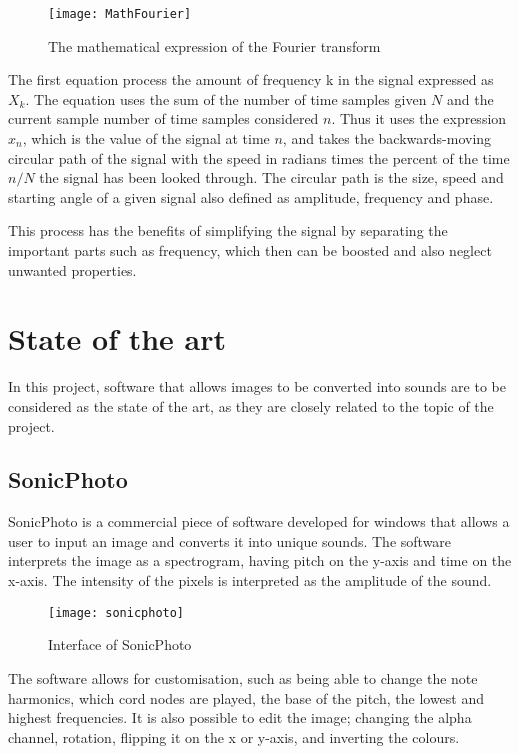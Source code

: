 \begin{figure}
\caption{The mathematical expression of the Fourier transform}
\centering
\texttt{[image: MathFourier]}
\end{figure}

The first equation process the amount of frequency k in the signal expressed as \(X_k\). The equation uses the sum of the number of time samples given \(N\) and the current sample number of time samples considered \(n\). Thus it uses the expression \(x_n\), which is the value of the signal at time \(n\), and takes  the backwards-moving circular path of the signal with the speed in radians times the percent of the time \(n/N\) the signal has been looked through. The circular path is the size, speed and starting angle of a given signal also defined as amplitude, frequency and phase.      

This process has the benefits of simplifying the signal by separating the important parts such as frequency, which then can be boosted and also neglect unwanted properties.       

\section{State of the art}\label{sec:stateart}
In this project, software that allows images to be converted into sounds are to be considered as the state of the art, as they are closely related to the topic of the project.

\subsection{SonicPhoto}\label{sub:sonic}
SonicPhoto \cite{White2013} is a commercial piece of software developed for windows that allows a user to input an image and converts it into unique sounds. The software interprets the image as a spectrogram, having pitch on the y-axis and time on the x-axis. The intensity of the pixels is interpreted as the amplitude of the sound. 

\begin{figure}[!h] 
\centering
\texttt{[image: sonicphoto]}
\caption{\label{fig:sonicphoto} Interface of SonicPhoto \cite{White2013}}
\end{figure}

The software allows for customisation, such as being able to change the note harmonics, which cord nodes are played, the base of the pitch, the lowest and highest frequencies. It is also possible to edit the image; changing the alpha channel, rotation, flipping it on the x or y-axis, and inverting the colours. 


